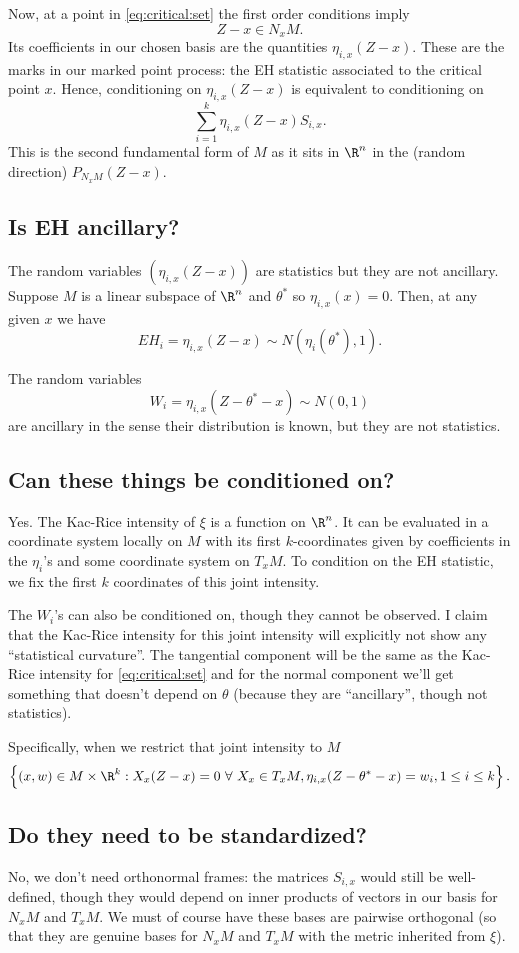 \documentclass{article}
\begin{document}
Now, at a point in \eqref{eq:critical:set} the first order conditions imply
$$
Z-x \in N_xM.
$$
Its coefficients in our chosen basis are the quantities $\eta_{i,x}(Z-x)$. These are the marks
in our marked point process: the EH statistic associated to the critical point $x$. Hence, conditioning on $\eta_{i,x}(Z-x)$ is equivalent to conditioning on 
$$
\sum_{i=1}^k \eta_{i,x}(Z-x) S_{i,x}.
$$
This is the second fundamental form of $M$ as it sits in $\R^n$ in the (random direction) $P_{N_xM}(Z-x)$.

\subsection{Is EH ancillary?}

The random variables $(\eta_{i,x}(Z-x))$ are statistics but they are not ancillary.
Suppose $M$ is a linear subspace of $\R^n$ and $\theta^*$ so $\eta_{i,x}(x)=0$.
Then, at any given $x$ we have
$$
EH_i = \eta_{i,x}(Z-x) \sim N(\eta_i(\theta^*), 1).
$$

The random variables
$$
W_i = \eta_{i,x}(Z-\theta^*-x) \sim N(0, 1)
$$
are ancillary in the sense their distribution is known, but they are not statistics.

\subsection{Can these things be conditioned on?}

Yes. The Kac-Rice intensity of $\xi$ is a function on $\R^n$. It can be evaluated in
a coordinate system locally on $M$ with its first $k$-coordinates given by coefficients
in the $\eta_i$'s and some coordinate system on $T_xM$. To condition on the
EH statistic, we fix the first $k$ coordinates of this joint intensity.

The $W_i$'s can also be conditioned on, though they cannot be observed. I claim that
the Kac-Rice intensity for this joint intensity will explicitly not show any ``statistical curvature''. The tangential component will be the same as the Kac-Rice intensity for
\eqref{eq:critical:set} and for the normal component we'll get something
that doesn't depend on $\theta$ (because they are ``ancillary'', though not statistics).

Specifically, when we restrict that joint
intensity to $M$ 
\begin{equation}
  \left\{(x,w) \in M \times \R^k: X_x(Z-x)=0 \ \forall \  X_x \in T_xM,
  \eta_{i,x}(Z-\theta^*-x)=w_i, 1 \leq i \leq k \right\}.
  \end{equation}

\subsection{Do they need to be standardized?}

No, we don't need orthonormal frames: the matrices $S_{i,x}$ would still be well-defined, though they would depend on inner products of vectors in our basis for $N_xM$ and $T_xM$. We must of course have these bases are pairwise orthogonal (so that they are genuine bases for $N_xM$ and $T_xM$ with the metric inherited from $\xi$).
\end{document}
